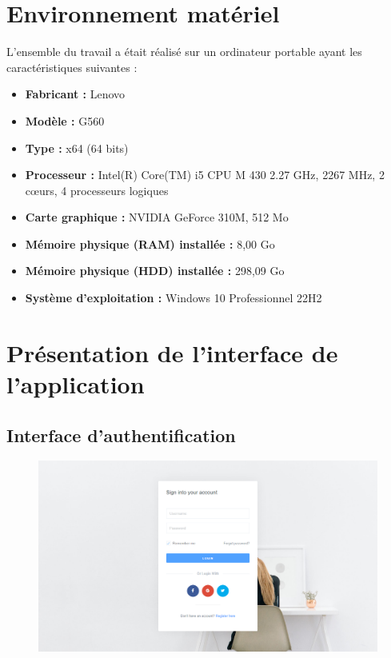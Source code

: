     \section[Environnement matériel]{Environnement matériel}
    L'ensemble du travail a était réalisé sur un ordinateur portable
    ayant les caractéristiques suivantes :
    \begin{itemize}
        \setlength{\itemsep}{0pt}
        \item [\ding{228}] \textbf{Fabricant :} Lenovo
        \item [\ding{228}] \textbf{Modèle :} G560
        \item [\ding{228}] \textbf{Type :} x64 (64 bits)
        \item [\ding{228}] \textbf{Processeur :} Intel(R) Core(TM) i5 CPU M 430 2.27 GHz, 2267 MHz, 2 cœurs, 4 processeurs logiques
        \item [\ding{228}] \textbf{Carte graphique :} NVIDIA GeForce 310M, 512 Mo
        \item [\ding{228}] \textbf{Mémoire physique (RAM) installée :} 8,00 Go
        \item [\ding{228}] \textbf{Mémoire physique (HDD) installée :} 298,09 Go
        \item [\ding{228}] \textbf{Système d'exploitation :} Windows 10 Professionnel 22H2
    \end{itemize}
    \section[Présentation de l’interface de l’application]{Présentation de l’interface de l’application}
            \subsection[Interface d’authentification]{Interface d’authentification}
            \begin{figure}[H]
                \centering
                \includegraphics[width=130mm]{images/presentation-de-la-solution/authentifier.png}
                \label{fig:mdSysteme}
            \end{figure}
